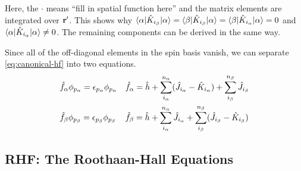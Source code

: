 \documentclass[11pt]{article}
\numberwithin{equation}{section}
\begin{document}
Here, the $\cdot$ means ``fill in spatial function here'' and the matrix elements are integrated over $\mathbf{r}'$.
This shows why $\langle\alpha |\hat{K}_{i_{\beta }}|\alpha \rangle=\langle\beta |\hat{K}_{i_{\beta }}|\alpha \rangle=\langle\beta |\hat{K}_{i_{\alpha }}|\alpha \rangle=0$ and $\langle\alpha |\hat{K}_{i_{\alpha }}|\alpha \rangle\neq0$.
The remaining components can be derived in the same way.

Since all of the off-diagonal elements in the spin basis vanish, we can separate \cref{eq:canonical-hf} into two equations.
\begin{align}\label{eq:canonical-uhf-equation-alpha}
&
  \hat{f}_{\alpha } \phi _{p_{\alpha }}
=
  \epsilon _{p_{\alpha }} \phi _{p_{\alpha }}
&&
  \hat{f}_{\alpha }
=
  \hat{h}
+
  \sum_{i_{\alpha }}^{n_{\alpha }}
  (\hat{J}_{i_{\alpha }} - \hat{K}_{i_{\alpha }})
+
  \sum_{i_{\beta }}^{n_{\beta }}
  \hat{J}_{i_{\beta }}
\\\label{eq:canonical-uhf-equation-beta}
&
  \hat{f}_{\beta } \phi _{p_{\beta }}
=
  \epsilon _{p_{\beta }} \phi _{p_{\beta }}
&&
  \hat{f}_{\beta }
=
  \hat{h}
+
  \sum_{i_{\alpha }}^{n_{\alpha }}
  \hat{J}_{i_{\alpha }}
+
  \sum_{i_{\beta }}^{n_{\beta }}
  (\hat{J}_{i_{\beta }} - \hat{K}_{i_{\beta }})
\end{align}




\subsection{RHF: The Roothaan-Hall Equations}
\end{document}
